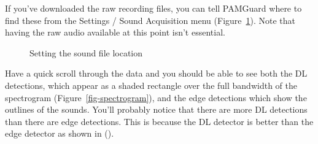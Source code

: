 \documentclass[
]{article}
\begin{document}
If you've downloaded the raw recording files, you can tell PAMGuard
where to find these from the Settings / Sound Acquisition menu
(Figure~\ref{fig-wavfiles}). Note that having the raw audio available at
this point isn't essential.

\begin{figure}


\caption{\label{fig-wavfiles}Setting the sound file location}

\end{figure}%

Have a quick scroll through the data and you should be able to see both
the DL detections, which appear as a shaded rectangle over the full
bandwidth of the spectrogram (Figure~\ref{fig-spectrogram}), and the
edge detections which show the outlines of the sounds. You'll probably
notice that there are more DL detections than there are edge detections.
This is because the DL detector is better than the edge detector as
shown in ().
\end{document}
